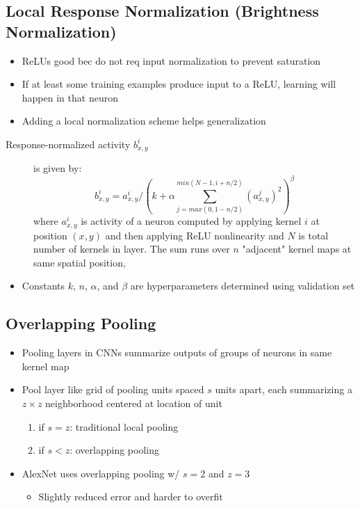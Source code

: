 \documentclass[a4paper,12pt]{article}
\begin{document}
\subsection{Local Response Normalization (Brightness Normalization)}
\begin{itemize}
  \item ReLUs good bec do not req input normalization to prevent saturation
  \item If at least some training examples produce input to a ReLU, learning will happen in that neuron
  \item Adding a local normalization scheme helps generalization
\end{itemize}
\begin{description}
  \item[Response-normalized activity $b^i_{x,y}$] is given by:
  \begin{equation}
    b^i_{x,y} = a^i_{x,y}/\left(k + \alpha\sum^{min(N-1,i+n/2)}_{j=max(0,1-n/2)}(a^j_{x,y})^2\right)^\beta
  \end{equation}
  where $a^i_{x,y}$ is activity of a neuron computed by applying kernel $i$ at position $(x,y)$ and then applying ReLU nonlinearity and $N$ is total number of kernels in layer. The sum runs over $n$ "adjacent" kernel maps at same spatial position,
\end{description}
\begin{itemize}
  \item Constants $k$, $n$, $\alpha$, and $\beta$ are hyperparameters determined using validation set
\end{itemize}

\subsection{Overlapping Pooling}
\begin{itemize}
  \item Pooling layers in CNNs summarize outputs of groups of neurons in same kernel map
  \item Pool layer like grid of pooling units spaced $s$ units apart, each summarizing a $z\times z$ neighborhood centered at location of unit
  \begin{enumerate}
    \item if $s = z$: traditional local pooling
    \item if $s < z$: overlapping pooling
  \end{enumerate}
  \item AlexNet uses overlapping pooling w/ $s = 2$ and $z = 3$
  \begin{itemize}
    \item Slightly reduced error and harder to overfit
  \end{itemize}
\end{itemize}
\end{document}
